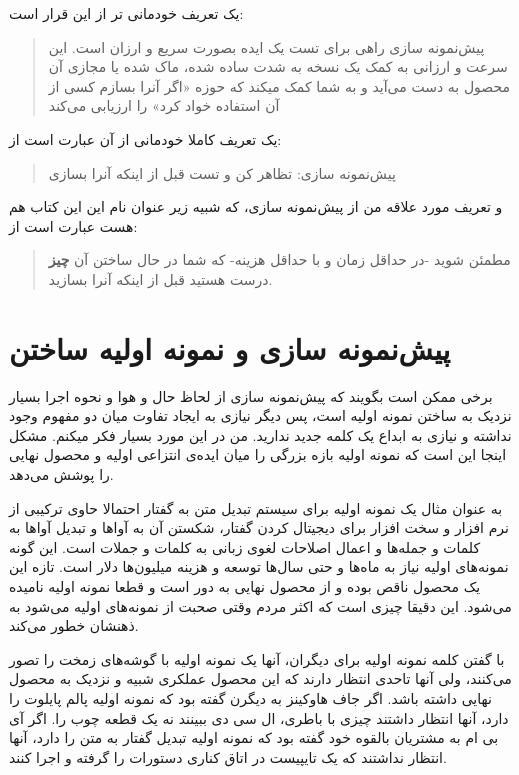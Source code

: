 یک تعریف خودمانی تر از این قرار است:

\begin{quote}
پیش‌نمونه سازی راهی برای تست یک ایده بصورت سریع و ارزان است. این سرعت و
ارزانی به کمک یک نسخه به شدت ساده شده، ماک شده یا مجازی آن محصول به دست
می‌آید و به شما کمک میکند که حوزه «اگر آنرا بسازم کسی از آن استفاده خواد
کرد» را ارزیابی می‌کند
\end{quote}

یک تعریف کاملا خودمانی از آن عبارت است از:

\begin{quote}
پیش‌نمونه سازی: تظاهر کن و تست قبل از اینکه آنرا بسازی
\end{quote}

و تعریف مورد علاقه من از پیش‌نمونه سازی، که شبیه زیر عنوان نام این این
کتاب هم هست عبارت است از:

\begin{quote}
مطمئن شوید -در حداقل زمان و با حداقل هزینه- که شما در حال ساختن آن
\textbf{چیز} درست هستید قبل از اینکه آنرا بسازید.
\end{quote}

\section{پیش‌نمونه سازی و نمونه اولیه
ساختن}\label{ux67eux6ccux634ux646ux645ux648ux646ux647-ux633ux627ux632ux6cc-ux648-ux646ux645ux648ux646ux647-ux627ux648ux644ux6ccux647-ux633ux627ux62eux62aux646}

برخی ممکن است بگویند که پیش‌نمونه سازی از لحاظ حال و هوا و نحوه اجرا
بسیار نزدیک به ساختن نمونه اولیه است، پس دیگر نیازی به ایجاد تفاوت میان
دو مفهوم وجود نداشته و نیازی به ابداع یک کلمه جدید ندارید. من در این
مورد بسیار فکر میکنم. مشکل اینجا این است که نمونه اولیه بازه بزرگی را
میان ایده‌ی انتزاعی اولیه و محصول نهایی را پوشش می‌دهد.

به عنوان مثال یک نمونه اولیه برای سیستم تبدیل متن به گفتار احتمالا حاوی
ترکیبی از نرم افزار و سخت افزار برای دیجیتال کردن گفتار، شکستن آن به
آواها و تبدیل آواها به کلمات و جمله‌ها و اعمال اصلاحات لغوی زبانی به
کلمات و جملات است. این گونه نمونه‌های اولیه نیاز به ماه‌ها و حتی سال‌ها
توسعه و هزینه میلیون‌ها دلار است. تازه این یک محصول ناقص بوده و از محصول
نهایی به دور است و قطعا نمونه اولیه نامیده می‌شود. این دقیقا چیزی است که
اکثر مردم وقتی صحبت از نمونه‌های اولیه می‌شود به ذهنشان خطور می‌کند.

با گفتن کلمه نمونه اولیه برای دیگران، آنها یک نمونه اولیه با گوشه‌های
زمخت را تصور می‌کنند، ولی آنها تاحدی انتظار دارند که این محصول عملکری
شبیه و نزدیک به محصول نهایی داشته باشد. اگر جاف هاوکینز به دیگرن گفته
بود که نمونه اولیه پالم پایلوت را دارد، آنها انتظار داشتند چیزی با
باطری، ال سی دی ببینند نه یک قطعه چوب را. اگر آی بی ام به مشتریان بالقوه
خود گفته بود که نمونه اولیه تبدیل گفتار به متن را دارد، آنها انتظار
نداشتند که یک تایپیست در اتاق کناری دستورات را گرفته و اجرا کنند.

